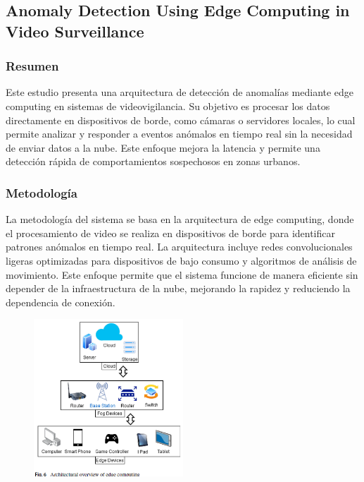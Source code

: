 \documentclass[listof=nochaptergap,12pt,times,authoryear]{report}
\begin{document}
\subsection{Anomaly Detection Using Edge Computing in Video Surveillance}

\subsubsection{Resumen}
Este estudio presenta una arquitectura de detección de anomalías mediante edge computing en sistemas de videovigilancia. Su objetivo es procesar los datos directamente en dispositivos de borde, como cámaras o servidores locales, lo cual permite analizar y responder a eventos anómalos en tiempo real sin la necesidad de enviar datos a la nube. Este enfoque mejora la latencia y permite una detección rápida de comportamientos sospechosos en zonas urbanos.

\subsubsection{Metodología}
La metodología del sistema se basa en la arquitectura de edge computing, donde el procesamiento de video se realiza en dispositivos de borde para identificar patrones anómalos en tiempo real. La arquitectura incluye redes convolucionales ligeras optimizadas para dispositivos de bajo consumo y algoritmos de análisis de movimiento. Este enfoque permite que el sistema funcione de manera eficiente sin depender de la infraestructura de la nube, mejorando la rapidez y reduciendo la dependencia de conexión.


\begin{figure}[h] %
    \centering
    \includegraphics[width=0.5\textwidth]{met4.png} %
    \label{fig:ejemplo} %
\end{figure}
\end{document}
